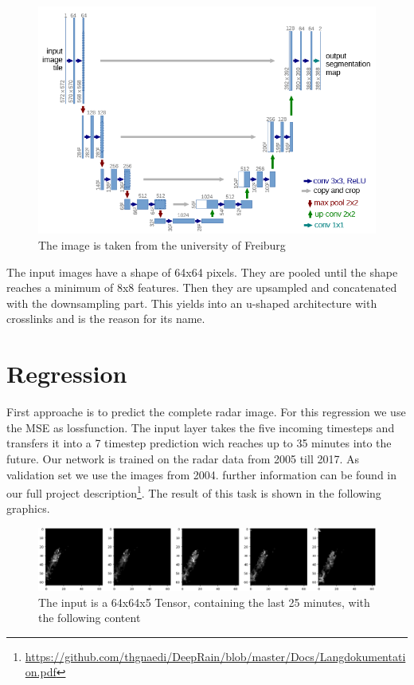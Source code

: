 \documentclass[oneside]{htwg-report}
\begin{document}
\begin{figure}[ht]
\centering
\includegraphics[width=0.8\linewidth]{../pics/UNet_Biomedical}
\caption{The image is taken from the university of Freiburg~\cite{ronneberger2015u}}
\end{figure}

The input images have a shape of 64x64 pixels. They are pooled until the shape reaches a minimum of 8x8 features. Then they are upsampled and concatenated with the downsampling part.
This yields into an u-shaped architecture with crosslinks and is the reason for its name.

\section*{Regression}
First approache is to predict the complete radar image. For this regression we use the MSE as lossfunction. The input layer takes the five incoming timesteps and transfers it into a 7 timestep prediction wich reaches up to 35 minutes into the future.
Our network is trained on the radar data from 2005 till 2017. As validation set we use the images from 2004. further information can be found in our full project description\footnote{\url{https://github.com/thgnaedi/DeepRain/blob/master/Docs/Langdokumentation.pdf}}.
The result of this task is shown in the following graphics.

\begin{figure}[ht]
\centering
\includegraphics[width=\linewidth]{../pics/dt5}
\caption{The input is a 64x64x5 Tensor, containing the last 25 minutes, with the following content}
\end{figure}
\end{document}
